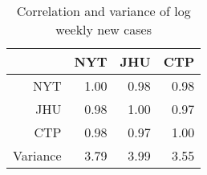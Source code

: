 \begin{table}[ht]
\centering
\begin{tabular}{rrrr}
  \hline
 & NYT & JHU & CTP \\ 
  \hline
NYT & 1.00 & 0.98 & 0.98 \\ 
  JHU & 0.98 & 1.00 & 0.97 \\ 
  CTP & 0.98 & 0.97 & 1.00 \\ 
  Variance & 3.79 & 3.99 & 3.55 \\ 
   \hline
\end{tabular}
\caption{Correlation and variance of log weekly new cases\label{tab:weekcasecor}} 
\end{table}
